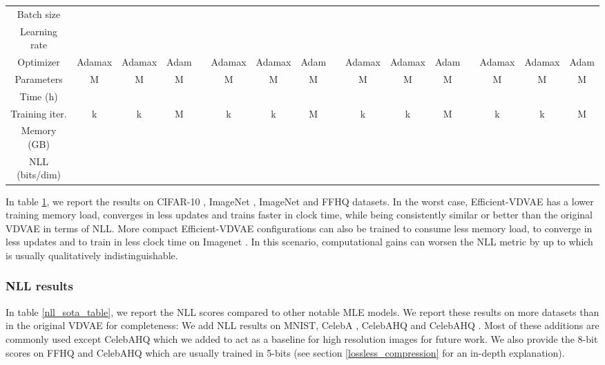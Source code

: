 \documentclass{article}
\begin{document}
\begin{table}[]
{\begin{tabular}{@{}cccclccclccclccc@{}}
Batch size &  &  &  &  &  &  &  &  &  &  &  &  &  &  &  \\
Learning rate &  &  &  &  &  &  &  &  &  &  &  &  &  &  &  \\
Optimizer & Adamax & Adamax & Adam &  & Adamax & Adamax & Adam & & Adamax & Adamax  & Adam &  & Adamax & Adamax & Adam  \\ 
Parameters & M & M & M &  & M & M & M & & M & M  & M &  & M & M & M  \\ 
\midrule
Time (h) &  &  &  &  &  &  &  &  &  &  &  &  &  &  &  \\
Training iter. & k & k & M &  & k & k & M &  & k & k & M &  & k & k & M  \\
Memory (GB) &  &  &  &  &  &  &  &  &  &  &  &  &  &  &  \\
NLL (bits/dim) &  &  &  &  &  &  &  &  &  &  &  &  &  &  &  \\
\bottomrule
\end{tabular}\label{quantitative_compute}
}
\end{table}

In table \ref{quantitative_compute}, we report the results on CIFAR-10 \cite{cifar}, ImageNet , ImageNet  \cite{deng2009imagenet} and FFHQ  \cite{ffhq} datasets. In the worst case, Efficient-VDVAE has a  lower training memory load, converges in  less updates and trains  faster in clock time, while being consistently similar or better than the original VDVAE in terms of NLL. More compact Efficient-VDVAE configurations can also be trained to consume  less memory load, to converge in  less updates and to train in  less clock time on Imagenet . In this scenario, computational gains can worsen the NLL metric by up to  which is usually qualitatively indistinguishable.

\subsubsection{NLL results}
In table \ref{nll_sota_table}, we report the NLL scores compared to other notable MLE models. We report these results on more datasets than in the original VDVAE for completeness: We add NLL results on MNIST\cite{lecun-mnisthandwrittendigit-2010}, CelebA \cite{liu2015deep, pmlr-v48-larsen16}, CelebAHQ  and CelebAHQ \cite{celebahq}. Most of these additions are commonly used except CelebAHQ  which we added to act as a baseline for high resolution images for future work. We also provide the 8-bit scores on FFHQ  and CelebAHQ  which are usually trained in 5-bits (see section \ref{lossless_compression} for an in-depth explanation).
\end{document}

